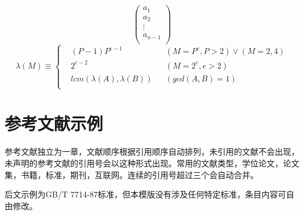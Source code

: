 \documentclass[a4paper]{article}
\begin{document}
\begin{body}
\begin{equation}[DFT]
\begin{pmatrix}
			a_{1}\\
			a_{2}\\
			\vdots\\
			a_{n-1}\\
			\end{pmatrix}
		\end{equation}
		\begin{equation}
		   \lambda(M)\equiv\left\lbrace\begin{aligned}
		   &(P-1)P^{e-1}&&(M=P^e,P>2)\vee(M=2,4)\\
		   &2^{e-2}&&(M=2^e,e>2)\\
		   &lcm(\lambda(A),\lambda(B))&&(gcd(A,B)=1)\\
		   \end{aligned}\right.
		\end{equation}
	\end{body}
	\section{参考文献示例}
	\begin{body}
		参考文献独立为一章，文献顺序根据引用顺序自动排列，未引用的文献不会出现，未声明的参考文献的引用号会以这种形式\cite{JB-ICPC}出现。常用的文献类型，学位论文\cite{thesis1}，论文集\cite{col1}，书籍\cite{book1,book2,book3}，标准\cite{standard1,standard2,standard3,standard4}，期刊\cite{journal1}，互联网\cite{online1}。连续的引用号超过三个会自动合并\cite{standard3,standard4,book1,book2,book3}。\par
		后文示例为GB/T 7714-87标准，但本模版没有涉及任何特定标准，条目内容可自由修改。\par
	\end{body}
\end{document}
